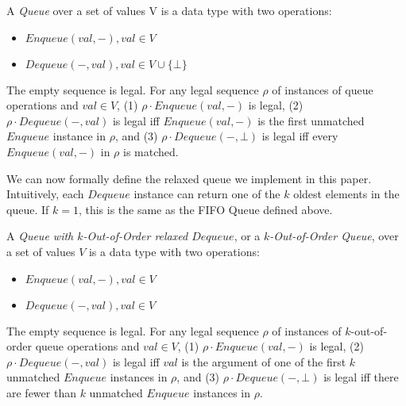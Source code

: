 \documentclass[a4paper,anonymous,USenglish]{lipics-v2021} %
\theoremstyle{definition}
\begin{document}
\begin{definition}\label{def:FIFOQueue}
  A \emph{Queue} over a set of values V is a data type with two operations:
  \begin{itemize}
  \item $Enqueue(val,-), val \in V$ 
  \item $Dequeue(-, val), val \in V \cup \{\bot\}$ 
  \end{itemize}
  
  The empty sequence is legal.  For any legal sequence $\rho$ of instances of queue operations and $val \in V$, (1) $\rho \cdot Enqueue(val,-)$ is legal, (2) $\rho \cdot Dequeue(-,val)$ is legal iff $Enqueue(val, -)$ is the first unmatched $Enqueue$ instance in $\rho$, and (3) $\rho \cdot Dequeue(-, \bot)$ is legal iff every $Enqueue(val, -)$ in $\rho$ is matched.
\end{definition}

We can now formally define the relaxed queue we implement in this paper.  Intuitively, each $Dequeue$ instance can return one of the $k$ oldest elements in the queue.  If $k=1$, this is the same as the FIFO Queue defined above.

\begin{definition} A \emph{Queue with $k$-Out-of-Order relaxed $Dequeue$}, or a \emph{$k$-Out-of-Order Queue}, over a set of values $V$ is a data type with two operations:
  \begin{itemize}
  \item $Enqueue(val,-), val \in V$
  \item $Dequeue(-,val), val \in V$
  \end{itemize}

  The empty sequence is legal.  For any legal sequence $\rho$ of instances of $k$-out-of-order queue operations and $val \in V$, (1) $\rho \cdot Enqueue(val,-)$ is legal, (2) $\rho \cdot Dequeue(-,val)$ is legal iff $val$ is the argument of one of the first $k$ unmatched $Enqueue$ instances in $\rho$, and (3) $\rho \cdot Dequeue(-,\bot)$ is legal iff there are fewer than $k$ unmatched $Enqueue$ instances in $\rho$.
\end{definition}
\end{document}
